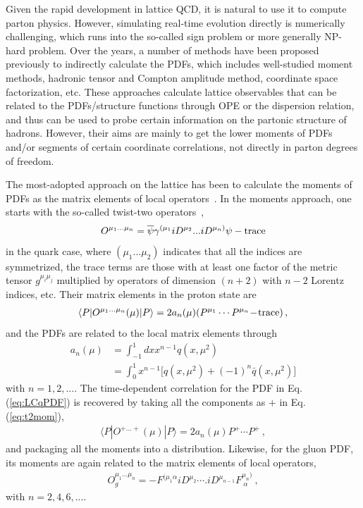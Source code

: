 \documentclass[aps,rmp,reprint,amsmath,amssymb,graphicx,longbibliography]{revtex4-1} %
\newcommand{\nn}{\nonumber}
\begin{document}
Given the rapid development in lattice QCD, it is natural to use it
to compute parton physics. However, simulating real-time evolution directly
is numerically challenging, which runs into the so-called sign problem or more
generally NP-hard problem. Over the years, a number of methods
have been proposed previously to indirectly calculate the PDFs, which
includes well-studied moment methods, hadronic tensor and Compton amplitude method,
coordinate space factorization, etc. These approaches calculate lattice observables that can be related to the PDFs/structure functions through OPE or the dispersion relation, and thus can be used to probe certain information on the partonic structure of hadrons. However, their aims are
mainly to get the lower moments of PDFs and/or
segments of certain coordinate correlations, not directly in parton
degrees of freedom.

The most-adopted approach on the lattice has been to calculate the moments of PDFs
as the matrix elements of local operators~\cite{Kronfeld:1984zv,Martinelli:1987si}.
In the moments approach, one starts with the so-called twist-two operators~\cite{Christ:1972ms},
\begin{align}
	O^{\mu_1...\mu_n}= {\overline \psi}\gamma^{(\mu_1}iD^{\mu_2} ... iD^{\mu_n)} \psi
	- {\rm trace}
	\label{eq:t2opq}
\end{align}
in the quark case, where $(\mu_1...\mu_2)$ indicates that all the indices are symmetrized, the trace terms are those with at least one factor of the metric
tensor $g^{\mu_i \mu_j}$ multiplied by operators of dimension $(n+2)$ with $n-2$ Lorentz indices, etc.
Their matrix elements in the proton state are
\begin{align}
	\langle P|O^{\mu_1...\mu_n}(\mu)|P\rangle =  2a_n(\mu) (P^{\mu_1}\cdots P^{\mu_n} \!-\! {\rm trace}) \,,
	\label{eq:t2mom}
\end{align}
and the PDFs are related to the local matrix elements through
\begin{align}
	{a_n(\mu)} &= { \int^1_{-1} dx x^{n-1} q(x, \mu^2)}\nn\\
	&= \int^1_0 x^{n-1} \big[q(x, \mu^2)+(-1)^n \bar q(x, \mu^2)\big]
	\label{eq:t2sum}
\end{align}
with $n=1,2,...$. The time-dependent correlation for the PDF
in Eq. (\ref{eq:LCqPDF}) is recovered by taking all the
components as $+$ in Eq. (\ref{eq:t2mom}),
\begin{align}
	\langle P|O^{+...+}(\mu)|P\rangle =2 a_n(\mu) P^+\cdots P^+ \,,
\end{align}
and packaging all the moments into a distribution.
Likewise, for the gluon PDF, its moments are again related
to the matrix elements of local operators,
\begin{align}
	O_g^{\mu_1...\mu_n} = -F^{(\mu_1\alpha}iD^{\mu_2}\cdots .iD^{\mu_{n-1}}F^{\mu_n)}_{\ \alpha}\ ,
	\label{eq:t2opg}
\end{align}
with $n=2,4,6,...$.
\end{document}
